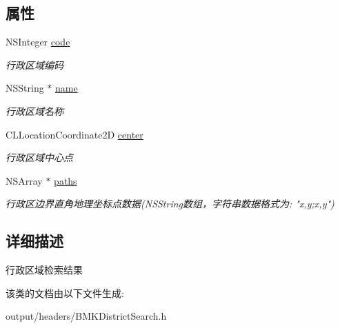 \subsection*{属性}
\begin{DoxyCompactItemize}
\item 
\hypertarget{interface_b_m_k_district_result_ab5e370fc1d52f002e47917ff408c5c38}{}N\+S\+Integer \hyperlink{interface_b_m_k_district_result_ab5e370fc1d52f002e47917ff408c5c38}{code}\label{interface_b_m_k_district_result_ab5e370fc1d52f002e47917ff408c5c38}

\begin{DoxyCompactList}\small\item\em 行政区域编码 \end{DoxyCompactList}\item 
\hypertarget{interface_b_m_k_district_result_a953947ae5c52348a5091eca8a90c5a34}{}N\+S\+String $\ast$ \hyperlink{interface_b_m_k_district_result_a953947ae5c52348a5091eca8a90c5a34}{name}\label{interface_b_m_k_district_result_a953947ae5c52348a5091eca8a90c5a34}

\begin{DoxyCompactList}\small\item\em 行政区域名称 \end{DoxyCompactList}\item 
\hypertarget{interface_b_m_k_district_result_aac8e4e0af49cfa026d3809e841a42023}{}C\+L\+Location\+Coordinate2\+D \hyperlink{interface_b_m_k_district_result_aac8e4e0af49cfa026d3809e841a42023}{center}\label{interface_b_m_k_district_result_aac8e4e0af49cfa026d3809e841a42023}

\begin{DoxyCompactList}\small\item\em 行政区域中心点 \end{DoxyCompactList}\item 
\hypertarget{interface_b_m_k_district_result_a4af32eba0327074d6e74d23efe222272}{}N\+S\+Array $\ast$ \hyperlink{interface_b_m_k_district_result_a4af32eba0327074d6e74d23efe222272}{paths}\label{interface_b_m_k_district_result_a4af32eba0327074d6e74d23efe222272}

\begin{DoxyCompactList}\small\item\em 行政区边界直角地理坐标点数据(N\+S\+String数组，字符串数据格式为\+: "x,y;x,y") \end{DoxyCompactList}\end{DoxyCompactItemize}


\subsection{详细描述}
行政区域检索结果 

该类的文档由以下文件生成\+:\begin{DoxyCompactItemize}
\item 
output/headers/B\+M\+K\+District\+Search.\+h\end{DoxyCompactItemize}
